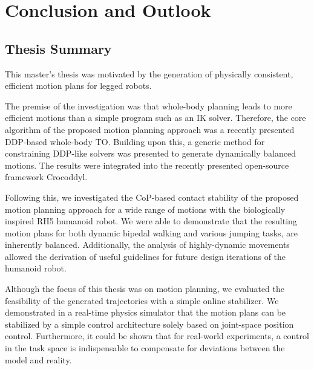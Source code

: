
\chapter{Conclusion and Outlook}\label{c7}

\section{Thesis Summary}
This master's thesis was motivated by the generation of physically consistent, efficient motion plans for legged robots. 

The premise of the investigation was that whole-body planning leads to more efficient motions than a simple program such as an \gls{IK} solver. Therefore, the core algorithm of the proposed motion planning approach was a recently presented \gls{DDP}-based whole-body \gls{TO}. Building upon this, a generic method for constraining DDP-like solvers was presented to generate dynamically balanced motions. The results were integrated into the recently presented open-source framework Crocoddyl.

Following this, we investigated the \gls{CoP}-based contact stability of the  proposed motion planning approach for a wide range of motions with the biologically inspired RH5 humanoid robot. We were able to demonstrate that the resulting motion plans for both dynamic bipedal walking and various jumping tasks, are inherently balanced. Additionally, the analysis of highly-dynamic movements allowed the derivation of useful guidelines for future design iterations of the humanoid robot.

Although the focus of this thesis was on motion planning, we evaluated the feasibility of the generated trajectories with a simple online stabilizer. We demonstrated in a real-time physics simulator that the motion plans can be stabilized by a simple control architecture solely based on joint-space position control. Furthermore, it could be shown that for real-world experiments, a control in the task space is indispensable to compensate for deviations between the model and reality. 

